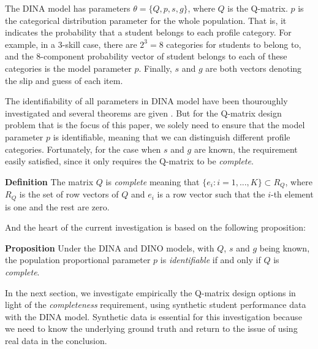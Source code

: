 \documentclass{edm_template}
\newcommand{\Michel}[1]{{\textcolor{red}{[#1]}}}
\begin{document}
The DINA model has parameters $\theta = \{Q, p, s, g\}$, where $Q$ is the Q-matrix. $p$ is the categorical distribution parameter for the whole population. That is, it indicates the probability that a student belongs to each profile category. For example, in a 3-skill case, there are $2^3=8$ categories for students to belong to, and the 8-component probability vector of student belongs to each of these categories is the model parameter $p$. Finally, $s$ and $g$ are both vectors denoting the slip and guess of each item. 

The identifiability of all parameters in DINA model have been thouroughly investigated and several theorems are given \cite{xu2015identifiability}. But for the Q-matrix design problem that is the focus of this paper, we solely need to ensure that the model parameter $p$ is identifiable, meaning that we can distinguish different profile categories. Fortunately, for the case when $s$ and $g$ are known, the requirement easily satisfied, since it only requires the Q-matrix to be \textit{complete}.

\textbf{Definition} \cite{xu2015identifiability}  The matrix $Q$ is \textit{complete} meaning that $\{e_{i}:i=1,...,K\} \subset R_{Q}$, where $R_{Q}$ is the set of row vectors of $Q$ and $e_{i}$ is a row vector such that the $i$-th element is one and the rest are zero.

And the heart of the current investigation is based on the following proposition:

\textbf{Proposition} \cite{xu2015identifiability} Under the DINA and DINO models, with $Q$, $s$ and $g$ being known, the population proportional parameter $p$ is \textit{identifiable} if and only if $Q$ is \textit{complete}.

   
%

In the next section, we investigate empirically the Q-matrix design options in light of the \textit{completeness} requirement, using synthetic student performance data with the DINA model.  Synthetic data is essential for this investigation because we need to know the underlying ground truth and return to the issue of using real data in the conclusion.
\end{document}
